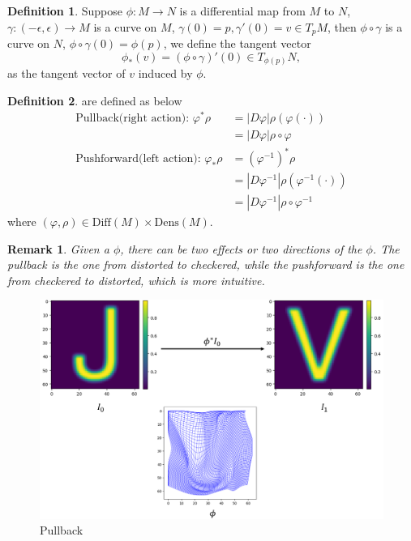 \documentclass[a4paper]{article}
\theoremstyle{definition}
\newtheorem{definition}{Definition}
\theoremstyle{plain}
\newtheorem{remark}{Remark}
\begin{document}
\begin{definition}
Suppose $\phi:M\rightarrow N$ is a differential map from $M$ to $N$, $\gamma:(-\epsilon,\epsilon)\rightarrow M$ is a curve on $M$, $\gamma(0)=p,\gamma'(0)=v\in T_pM$, then $\phi\circ\gamma$ is a curve on $N$, $\phi\circ\gamma(0)=\phi(p)$, we define the tangent vector
\begin{equation*}
    \phi_*(v)=(\phi\circ\gamma)'(0)\in T_{\phi(p)}N,
\end{equation*}
as the  tangent vector of $v$ induced by $\phi$.
\end{definition}

\begin{definition}
 are defined as below
\begin{align*}
    \text{Pullback(right action):  }\varphi^*\rho&=|D\varphi|\rho(\varphi(\cdot))\\
    &=|D\varphi|\rho\circ\varphi\\
    \text{Pushforward(left action):  }\varphi_*\rho&=(\varphi^{-1})^*\rho\\
    &=|D\varphi^{-1}|\rho(\varphi^{-1}(\cdot))\\
    &=|D\varphi^{-1}|\rho\circ\varphi^{-1}
\end{align*}
where $(\varphi,\rho)\in\mathrm{Diff}(M)\times\mathrm{Dens}(M)$.
\end{definition}

\begin{remark}
Given a $\phi$, there can be two effects or two directions of the $\phi$. The pullback is the one from distorted to checkered, while the pushforward is the one from checkered to distorted, which is more intuitive.
\end{remark}

\begin{figure}[H]
\centering
\includegraphics[scale=0.15]{figure/pullbackphi.png}
\caption{Pullback}
\end{figure}
\end{document}
